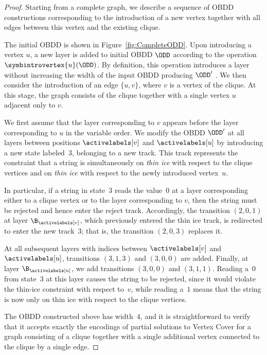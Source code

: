 \begin{proof}
Starting from a complete graph, we describe a sequence of OBDD constructions
corresponding to the introduction of a new vertex together with all edges
between this vertex and the existing clique.

The initial OBDD is shown in Figure~\ref{fig:CompleteODD}. Upon introducing a
vertex $u$, a new layer is added to initial OBDD $\ODD$ according to the operation
$\symbintrovertex{u}(\ODD)$. By definition, this operation introduces a layer without
increasing the width of the input OBDD producing $\ODD'$ . We then consider the introduction of an
edge $\{u,v\}$, where $v$ is a vertex of the clique. At this stage, the graph
consists of the clique together with a single vertex $u$ adjacent only to $v$. 

We first assume that the layer corresponding to $v$ appears before the layer
corresponding to $u$ in the variable order. We modify the OBDD $\ODD'$ at all
layers between positions $\activelabels[v]$ and $\activelabels[u]$ by introducing
a new state labeled~$3$, belonging to a new track. This track represents the
constraint that a string is simultaneously on \emph{thin ice} with respect to
the clique vertices and on \emph{thin ice} with respect to the newly introduced
vertex~$u$.

In particular, if a string in state~$3$ reads the value~$0$ at a layer
corresponding either to a clique vertex or to the layer corresponding to $v$,
then the string must be rejected and hence enter the reject track. Accordingly,
the transition $(2,0,1)$ at layer $\B_{\activelabels[v]}$, which previously
entered the thin ice track, is redirected to enter the new track~$3$; that is,
the transition $(2,0,3)$ replaces it.

At all subsequent layers with indices between $\activelabels[v]$ and
$\activelabels[u]$, transitions $(3,1,3)$ and $(3,0,0)$ are added. Finally, at
layer $\B_{\activelabels[u]}$, we add transitions $(3,0,0)$ and $(3,1,1)$. Reading
a~$0$ from state~$3$ at this layer causes the string to be rejected, since it
would violate the thin-ice constraint with respect to~$v$, while reading a~$1$
means that the string is now only on thin ice with respect to the clique
vertices.

The OBDD constructed above has width~$4$, and it is straightforward to verify
that it accepts exactly the encodings of partial solutions to {\sc Vertex Cover}
for a graph consisting of a clique together with a single additional vertex
connected to the clique by a single edge.


\end{proof}

